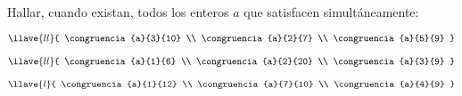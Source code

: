 \begin{enunciado}{\ejercicio}
  Hallar, cuando existan, todos los enteros $a$ que satisfacen simultáneamente:\\

  \begin{enumerate}[label=\roman*)]
    \begin{multicols}{3}
      \item
      $
        \llave{ll}{
          \congruencia{a}{3}{10} \\
          \congruencia{a}{2}{7}  \\
          \congruencia{a}{5}{9}
        }
      $
      \item
      $
        \llave{ll}{
          \congruencia{a}{1}{6}  \\
          \congruencia{a}{2}{20} \\
          \congruencia{a}{3}{9}
        }
      $

      \item $
        \llave{l}{
          \congruencia{a}{1}{12} \\
          \congruencia{a}{7}{10} \\
          \congruencia{a}{4}{9}
        }
      $
    \end{multicols}
  \end{enumerate}

\end{enunciado}

